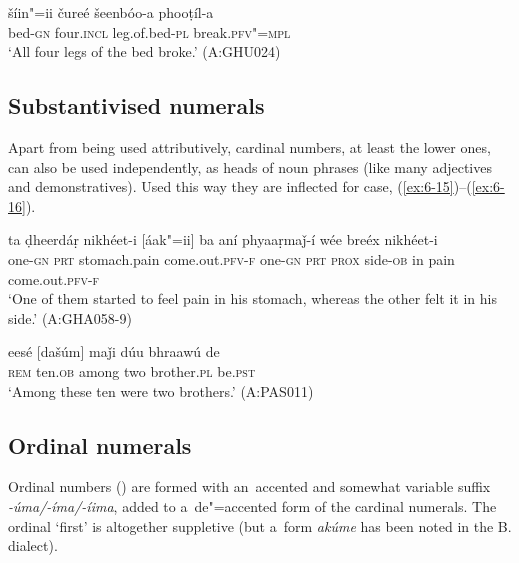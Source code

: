 \begin{exe}
\ex
\label{ex:6-14}
\gll šíin"=ii čureé šeenbóo-a phooṭíl-a \\
bed-\textsc{gn} four.\textsc{incl} leg.of.bed-\textsc{pl} break.\textsc{pfv"=mpl} \\
\glt `All four legs of the bed broke.' (A:GHU024)
\end{exe}

\subsection{Substantivised numerals}
\label{subsec:6-4-2}


Apart from being used attributively, cardinal numbers, at least the lower ones, can also be used independently, as heads of noun phrases (like many adjectives and demonstratives). Used this way they are inflected for case, (\ref{ex:6-15})--(\ref{ex:6-16}).

\begin{exe}
\ex
\label{ex:6-15}
\gll [áak"=ii] ta ḍheerdáṛ nikhéet-i [áak"=ii] ba  aní phyaaṛmaǰ-í wée
breéx nikhéet-i \\
one-\textsc{gn} \textsc{prt} stomach.pain come.out.\textsc{pfv-f} one-\textsc{gn} \textsc{prt} \textsc{prox} side-\textsc{ob} in pain come.out.\textsc{pfv-f} \\
\glt `One of them started to feel pain in his stomach, whereas the other felt it in his side.'
(A:GHA058-9)

\ex
\label{ex:6-16}
\gll eesé [dašúm] maǰi dúu bhraawú de  \\
\textsc{rem} ten.\textsc{ob} among two brother.\textsc{pl} be.\textsc{pst}  \\
\glt `Among these ten were two brothers.' (A:PAS011)
\end{exe}

\subsection{Ordinal numerals}
\label{subsec:6-4-3}

Ordinal numbers () are formed with an~accented and somewhat variable suffix \textit{-úma/-íma/-íima}, added to a~de"=accented form of the cardinal numerals. The ordinal `first' is altogether suppletive (but a~form \textit{akúme} has been noted in the B. dialect).


